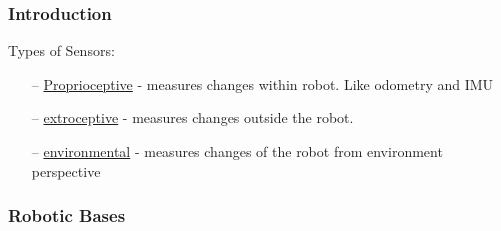 \documentclass{article}
\begin{document}
\subsubsection*{Introduction}
Types of Sensors:

\begin{itemize}[noitemsep,topsep=0pt]
\item[--] \setul{1pt}{.4pt}\ul{Proprioceptive} - measures changes within robot. Like odometry and IMU
\item[--] \setul{1pt}{.4pt}\ul{extroceptive} - measures changes outside the robot. 
\item[--] \setul{1pt}{.4pt}\ul{environmental} - measures changes of the robot from environment perspective
\end{itemize}
\subsubsection*{Robotic Bases}
\end{document}
